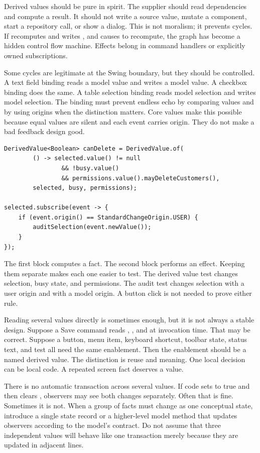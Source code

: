 Derived values should be pure in spirit. The supplier should read dependencies
and compute a result. It should not write a source value, mutate a component,
start a repository call, or show a dialog. This is not moralism; it prevents
cycles. If  recomputes and writes , and 
causes  to recompute, the graph has become a hidden control flow
machine. Effects belong in command handlers or explicitly owned subscriptions.

Some cycles are legitimate at the Swing boundary, but they should be controlled.
A text field binding reads a model value and writes a model value. A checkbox
binding does the same. A table selection binding reads model selection and writes
model selection. The binding must prevent endless echo by comparing values and by
using origins when the distinction matters. Core values make this possible
because equal values are silent and each event carries origin. They do not make a
bad feedback design good.

\begin{lstlisting}[caption={A derived value should compute, not cause effects.}]
DerivedValue<Boolean> canDelete = DerivedValue.of(
        () -> selected.value() != null
                && !busy.value()
                && permissions.value().mayDeleteCustomers(),
        selected, busy, permissions);

selected.subscribe(event -> {
    if (event.origin() == StandardChangeOrigin.USER) {
        auditSelection(event.newValue());
    }
});
\end{lstlisting}

The first block computes a fact. The second block performs an effect. Keeping
them separate makes each one easier to test. The derived value test changes
selection, busy state, and permissions. The audit test changes selection with a
user origin and with a model origin. A button click is not needed to prove either
rule.

Reading several values directly is sometimes enough, but it is not always a
stable design. Suppose a Save command reads , , and
 at invocation time. That may be correct. Suppose a button, menu item,
keyboard shortcut, toolbar state, status text, and test all need the same
enablement. Then the enablement should be a named derived value. The distinction
is reuse and meaning. One local decision can be local code. A repeated screen
fact deserves a value.

There is no automatic transaction across several values. If code sets
 to true and then clears , observers may see both
changes separately. Often that is fine. Sometimes it is not. When a group of
facts must change as one conceptual state, introduce a single state record or a
higher-level model method that updates observers according to the model's
contract. Do not assume that three independent values will behave like one
transaction merely because they are updated in adjacent lines.

